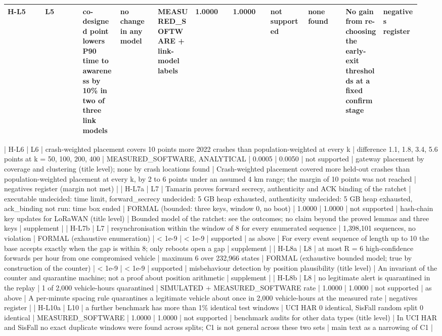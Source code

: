 {\begin{longtable}{p{0.086\linewidth}p{0.086\linewidth}p{0.086\linewidth}p{0.086\linewidth}p{0.086\linewidth}p{0.086\linewidth}p{0.086\linewidth}p{0.086\linewidth}p{0.086\linewidth}p{0.086\linewidth}p{0.086\linewidth}}
H-L5 & L5 & co-designed point lowers P90 time to awareness by 10\% in two of three link models & no change in any model & MEASURED\_SOFTWARE + link-model labels & 1.0000 & 1.0000 & not supported & none found & No gain from re-choosing the early-exit thresholds at a fixed confirm stage & negatives register \\
\bottomrule
\end{longtable}}

| H-L6 | L6 | crash-weighted placement covers 10 points more 2022 crashes than population-weighted at every k | difference 1.1, 1.8, 3.4, 5.6 points at k = 50, 100, 200, 400 | MEASURED\_SOFTWARE, ANALYTICAL | 0.0005 | 0.0050 | not supported | gateway placement by coverage and clustering (title level); none by crash locations found | Crash-weighted placement covered more held-out crashes than population-weighted placement at every k, by 2 to 6 points under an assumed 4 km range; the margin of 10 points was not reached | negatives register (margin not met) |
| H-L7a | L7 | Tamarin proves forward secrecy, authenticity and ACK binding of the ratchet | executable undecided: time limit, forward\_secrecy undecided: 5 GB heap exhausted, authenticity undecided: 5 GB heap exhausted, ack\_binding not run: time box ended | FORMAL (bounded: three keys, window 0, no boot) | 1.0000 | 1.0000 | not supported | hash-chain key updates for LoRaWAN (title level) | Bounded model of the ratchet: see the outcomes; no claim beyond the proved lemmas and three keys | supplement |
| H-L7b | L7 | resynchronisation within the window of 8 for every enumerated sequence | 1,398,101 sequences, no violation | FORMAL (exhaustive enumeration) | < 1e-9 | < 1e-9 | supported | as above | For every event sequence of length up to 10 the base accepts exactly when the gap is within 8; only reboots open a gap | supplement |
| H-L8a | L8 | at most R = 6 high-confidence forwards per hour from one compromised vehicle | maximum 6 over 232,966 states | FORMAL (exhaustive bounded model; true by construction of the counter) | < 1e-9 | < 1e-9 | supported | misbehaviour detection by position plausibility (title level) | An invariant of the counter and quarantine machine; not a proof about position arithmetic | supplement |
| H-L8b | L8 | no legitimate alert is quarantined in the replay | 1 of 2,000 vehicle-hours quarantined | SIMULATED + MEASURED\_SOFTWARE rate | 1.0000 | 1.0000 | not supported | as above | A per-minute spacing rule quarantines a legitimate vehicle about once in 2,000 vehicle-hours at the measured rate | negatives register |
| H-L10a | L10 | a further benchmark has more than 1\% identical test windows | UCI HAR 0 identical, SisFall random split 0 identical | MEASURED\_SOFTWARE | 1.0000 | 1.0000 | not supported | benchmark audits for other data types (title level) | In UCI HAR and SisFall no exact duplicate windows were found across splits; C1 is not general across these two sets | main text as a narrowing of C1 |

